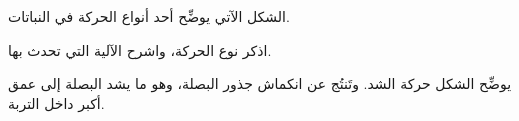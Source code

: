 
\begin{question}

\begin{instance}

\begin{frq}

\begin{stem}
الشكل الآتي يوضِّح أحد أنواع الحركة في النباتات.\par
{}اذكر نوع الحركة، واشرح الآلية التي تحدث بها.\par

\end{stem}

\begin{answer}
يوضِّح الشكل حركة الشد. وتَنتُج عن انكماش جذور البصلة، وهو ما يشد البصلة إلى عمق أكبر داخل التربة.\par

\end{answer}

\end{frq}

\end{instance}

\end{question}
